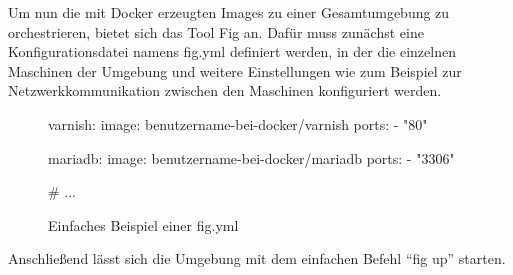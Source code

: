Um nun die mit Docker erzeugten Images zu einer Gesamtumgebung zu orchestrieren, bietet sich das Tool Fig an. Dafür muss zunächst eine Konfigurationsdatei namens fig.yml definiert werden, in der die einzelnen Maschinen der Umgebung und weitere Einstellungen wie zum Beispiel zur Netzwerkkommunikation zwischen den Maschinen konfiguriert werden.

\begin{figure}[!ht]
  \begin{center}
    \begin{yamlcode}
varnish:
  image: benutzername-bei-docker/varnish
  ports:
   - "80"

mariadb:
  image: benutzername-bei-docker/mariadb
  ports:
   - "3306"

# ...
    \end{yamlcode}
    \caption{Einfaches Beispiel einer fig.yml}
  \end{center}
\end{figure}

Anschließend lässt sich die Umgebung mit dem einfachen Befehl "`fig up"' starten.
